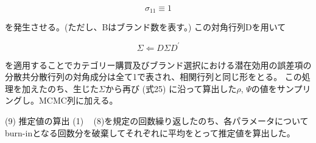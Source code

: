 \documentclass[11pt]{jsarticle}
\begin{document}
\begin{equation} \label{formula55-1}
\sigma_{11} \equiv 1
\end{equation}

を発生させる。(ただし、Bはブランド数を表す。)
この対角行列Dを用いて

\begin{equation} \label{formula56}
\Sigma \Leftarrow D \Sigma D^{\prime}
\end{equation}

を適用することでカテゴリー購買及びブランド選択における潜在効用の誤差項の分散共分散行列の対角成分は全て1で表され、相関行列と同じ形をとる。
この処理を加えたのち、生じた$\Sigma$から再び
(式25)
に沿って算出した$\rho$, $\Psi$の値をサンプリングし。MCMC列に加える。

(9) 推定値の算出
(1) ~ (8)を規定の回数繰り返したのち、各パラメータについてburn-inとなる回数分を破棄してそれぞれに平均をとって推定値を算出した。


\newpage



\end{document}
